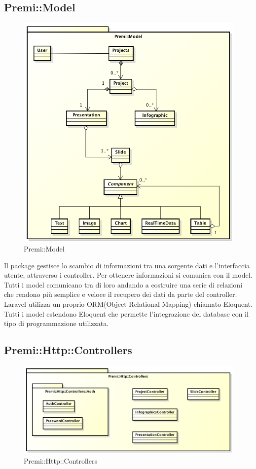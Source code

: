 \subsection{Premi::Model}
	\begin{figure}[h]
		\centering
		\includegraphics[width=0.7\linewidth]{img/premi_model}
		\caption[Premi::Model]{Premi::Model}
		\label{fig:back_end_premi_model}
	\end{figure}

	
Il package gestisce lo scambio di informazioni tra una sorgente dati e l'interfaccia utente, attraverso i controller. Per ottenere informazioni si comunica con il model. Tutti i model comunicano tra di loro andando a costruire una serie di relazioni che rendono più semplice e veloce il recupero dei dati da parte del controller. \gls{Laravel} utilizza un proprio \gls{ORM}(Object Relational Mapping) chiamato Eloquent. Tutti i model estendono Eloquent che permette l'integrazione del \gls{database} con il tipo di programmazione utilizzata.

\newpage



\newpage
\subsection{Premi::Http::Controllers}
	\begin{figure}[h]
		\centering
		\includegraphics[width=0.7\linewidth]{img/back_end_premi_http_controllers}
		\caption[Premi::Http::Controllers]{Premi::Http::Controllers}
		\label{fig:back_end_premi_http_controllers}
	\end{figure}


